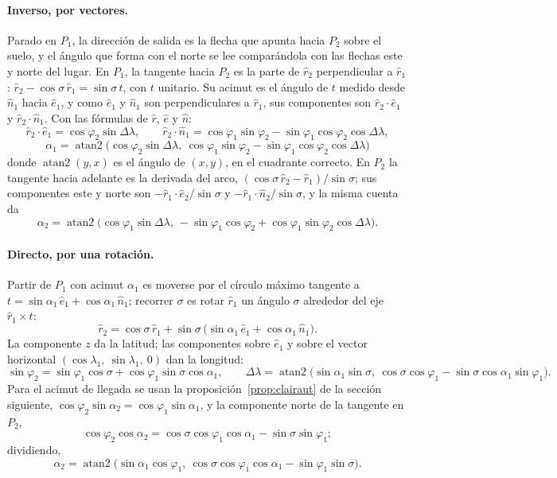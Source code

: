 \paragraph{Inverso, por vectores.} Parado en \(P_1\), la dirección de salida es la flecha que
apunta hacia \(P_2\) sobre el suelo, y el ángulo que forma con el norte se lee comparándola con las flechas este y
norte del lugar. En \(P_1\), la tangente hacia \(P_2\) es la parte de
\(\hat r_2\) perpendicular a \(\hat r_1\): \(\hat r_2-\cos\sigma\,\hat r_1=\sin\sigma\,t\), con
\(t\) unitario. Su acimut es el ángulo de \(t\) medido desde \(\hat n_1\) hacia \(\hat e_1\),
y como \(\hat e_1\) y \(\hat n_1\) son perpendiculares a \(\hat r_1\), sus componentes son
\(\hat r_2\cdot\hat e_1\) y \(\hat r_2\cdot\hat n_1\). Con las fórmulas de \(\hat r\),
\(\hat e\) y \(\hat n\):
\[
  \hat r_2\cdot\hat e_1=\cos\varphi_2\sin\Delta\lambda,\qquad
  \hat r_2\cdot\hat n_1=\cos\varphi_1\sin\varphi_2-\sin\varphi_1\cos\varphi_2\cos\Delta\lambda,
\]
\[
  \boxed{\ \alpha_1=\operatorname{atan2}\bigl(\cos\varphi_2\sin\Delta\lambda,\
  \cos\varphi_1\sin\varphi_2-\sin\varphi_1\cos\varphi_2\cos\Delta\lambda\bigr)\ }
\]
donde \(\operatorname{atan2}(y,x)\) es el ángulo de \((x,y)\), en el cuadrante correcto. En
\(P_2\) la tangente hacia adelante es la derivada del arco,
\((\cos\sigma\,\hat r_2-\hat r_1)/\sin\sigma\); sus componentes este y norte son
\(-\hat r_1\cdot\hat e_2/\sin\sigma\) y \(-\hat r_1\cdot\hat n_2/\sin\sigma\), y la misma
cuenta da
\[
  \alpha_2=\operatorname{atan2}\bigl(\cos\varphi_1\sin\Delta\lambda,\
  -\sin\varphi_1\cos\varphi_2+\cos\varphi_1\sin\varphi_2\cos\Delta\lambda\bigr).
\]

\paragraph{Directo, por una rotación.} Partir de \(P_1\) con acimut \(\alpha_1\) es moverse
por el círculo máximo tangente a \(t=\sin\alpha_1\,\hat e_1+\cos\alpha_1\,\hat n_1\); recorrer
\(\sigma\) es rotar \(\hat r_1\) un ángulo \(\sigma\) alrededor del eje \(\hat r_1\times t\):
\[
  \hat r_2=\cos\sigma\,\hat r_1+\sin\sigma\,\bigl(\sin\alpha_1\,\hat e_1+\cos\alpha_1\,\hat n_1\bigr).
\]
La componente \(z\) da la latitud; las componentes sobre \(\hat e_1\) y sobre el vector
horizontal \((\cos\lambda_1,\ \sin\lambda_1,\ 0)\) dan la longitud:
\[
  \sin\varphi_2=\sin\varphi_1\cos\sigma+\cos\varphi_1\sin\sigma\cos\alpha_1,\qquad
  \Delta\lambda=\operatorname{atan2}\bigl(\sin\alpha_1\sin\sigma,\
  \cos\sigma\cos\varphi_1-\sin\sigma\cos\alpha_1\sin\varphi_1\bigr).
\]
Para el acimut de llegada se usan la proposición~\ref{prop:clairaut} de la sección siguiente,
\(\cos\varphi_2\sin\alpha_2=\cos\varphi_1\sin\alpha_1\), y la componente norte de la
tangente en \(P_2\),
\[
  \cos\varphi_2\cos\alpha_2=\cos\sigma\cos\varphi_1\cos\alpha_1-\sin\sigma\sin\varphi_1 ;
\]
dividiendo,
\[
  \alpha_2=\operatorname{atan2}\bigl(\sin\alpha_1\cos\varphi_1,\
  \cos\sigma\cos\varphi_1\cos\alpha_1-\sin\varphi_1\sin\sigma\bigr).
\]

